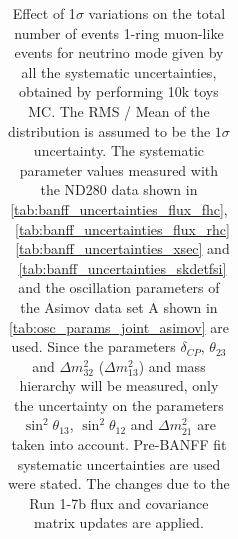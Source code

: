 \begin{table}[htb]
\begin{tabular}{| c | c | c |}
\end{tabular}
\caption{
 Effect of 1$\sigma$ variations on the total number of events 1-ring muon-like events for neutrino mode
 given by all the systematic uncertainties, obtained by performing 10k toys MC.
The RMS / Mean of the distribution is assumed to be the $1\sigma$ uncertainty.
The systematic parameter values measured with the ND280 data 
shown in 
\cref{tab:banff_uncertainties_flux_fhc},
~\ref{tab:banff_uncertainties_flux_rhc}
~\ref{tab:banff_uncertainties_xsec}
and
~\ref{tab:banff_uncertainties_skdetfsi}
and the oscillation parameters of the Asimov data set A shown in \cref{tab:osc_params_joint_asimov}
are used.
Since the parameters $\delta_{CP}$, $\theta_{23}$ and $\Delta m^2_{32}$ ($\Delta m^2_{13}$) and mass hierarchy
will be measured,
only the uncertainty on the parameters 
$\sin^2 \theta_{13}$,
$\sin^2 \theta_{12}$
and 
$\Delta m^2_{21}$ 
are taken into account.
Pre-BANFF fit systematic uncertainties are used were stated.
The changes due to the Run 1-7b flux and covariance matrix updates are applied.
}                                                                                                                                                                                          
\label{tab:nsk_systematic_table_summary_joint_asimov_A_fhc_mulike_Run17b}
\end{table}






